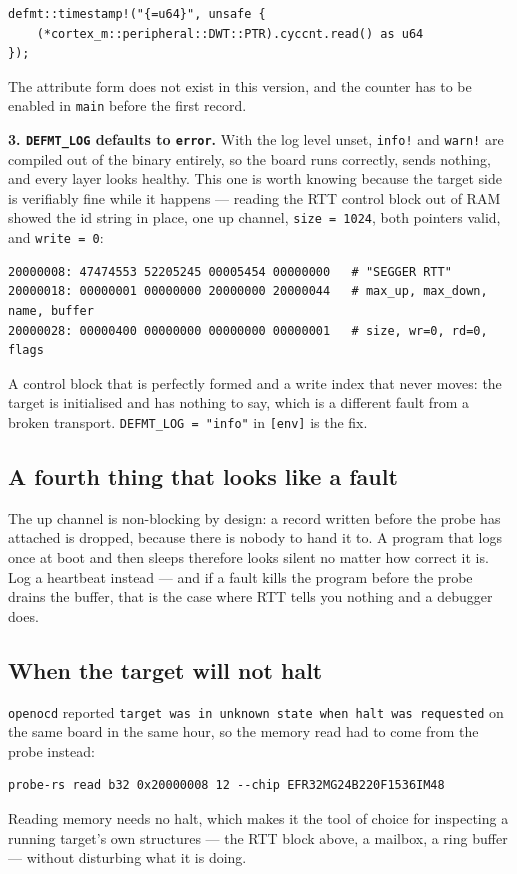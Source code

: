 \begin{verbatim}
defmt::timestamp!("{=u64}", unsafe {
    (*cortex_m::peripheral::DWT::PTR).cyccnt.read() as u64
});
\end{verbatim}

The attribute form does not exist in this version, and the counter has to be enabled in \texttt{main} before the first
record.

\textbf{3. \texttt{DEFMT\_LOG} defaults to \texttt{error}.} With the log level unset, \texttt{info!} and \texttt{warn!}
are compiled out of the binary entirely, so the board runs correctly, sends nothing, and every layer looks healthy. This
one is worth knowing because the target side is verifiably fine while it happens --- reading the RTT control block out of
RAM showed the id string in place, one up channel, \texttt{size = 1024}, both pointers valid, and \texttt{write = 0}:

\begin{verbatim}
20000008: 47474553 52205245 00005454 00000000   # "SEGGER RTT"
20000018: 00000001 00000000 20000000 20000044   # max_up, max_down, name, buffer
20000028: 00000400 00000000 00000000 00000001   # size, wr=0, rd=0, flags
\end{verbatim}

A control block that is perfectly formed and a write index that never moves: the target is initialised and has nothing to
say, which is a different fault from a broken transport. \texttt{DEFMT\_LOG = "info"} in \texttt{[env]} is the fix.

\subsection{A fourth thing that looks like a fault}

The up channel is non-blocking by design: a record written before the probe has attached is dropped, because there is
nobody to hand it to. A program that logs once at boot and then sleeps therefore looks silent no matter how correct it
is. Log a heartbeat instead --- and if a fault kills the program before the probe drains the buffer, that is the case
where RTT tells you nothing and a debugger does.

\subsection{When the target will not halt}

\texttt{openocd} reported \texttt{target was in unknown state when halt was requested} on the same board in the same
hour, so the memory read had to come from the probe instead:

\begin{verbatim}
probe-rs read b32 0x20000008 12 --chip EFR32MG24B220F1536IM48
\end{verbatim}

Reading memory needs no halt, which makes it the tool of choice for inspecting a running target's own structures --- the
RTT block above, a mailbox, a ring buffer --- without disturbing what it is doing.

